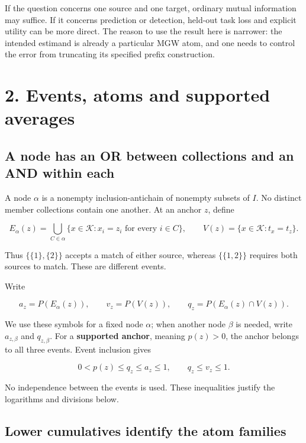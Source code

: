 \documentclass[11pt,a4paper]{article}
\newcounter{none}
\begin{document}
If the question concerns one source and one target, ordinary mutual information may suffice. If it concerns prediction or detection, held-out task loss and explicit utility can be more direct. The reason to use the result here is narrower: the intended estimand is already a particular MGW atom, and one needs to control the error from truncating its specified prefix construction.

\section{2. Events, atoms and supported averages}\label{events-atoms-and-supported-averages}

\subsection{A node has an OR between collections and an AND within each}\label{a-node-has-an-or-between-collections-and-an-and-within-each}

A node \(\alpha\) is a nonempty inclusion-antichain of nonempty subsets of \(I\). No distinct member collections contain one another. At an anchor \(z\), define

\[
E_\alpha(z)=\bigcup_{C\in\alpha}
 \{x\in\mathcal K:x_i=z_i\text{ for every }i\in C\},
\qquad
V(z)=\{x\in\mathcal K:t_x=t_z\}.
\]

Thus \(\{\{1\},\{2\}\}\) accepts a match of either source, whereas \(\{\{1,2\}\}\) requires both sources to match. These are different events.

Write

\[
a_z=P(E_\alpha(z)),\qquad
v_z=P(V(z)),\qquad
q_z=P(E_\alpha(z)\cap V(z)).
\]

We use these symbols for a fixed node \(\alpha\); when another node \(\beta\) is needed, write \(a_{z,\beta}\) and \(q_{z,\beta}\). For a \textbf{supported anchor}, meaning \(p(z)>0\), the anchor belongs to all three events. Event inclusion gives

\[
0<p(z)\le q_z\le a_z\le1,
\qquad q_z\le v_z\le1. \tag{1}
\]

No independence between the events is used. These inequalities justify the logarithms and divisions below.

\subsection{Lower cumulatives identify the atom families}\label{lower-cumulatives-identify-the-atom-families}
\end{document}
